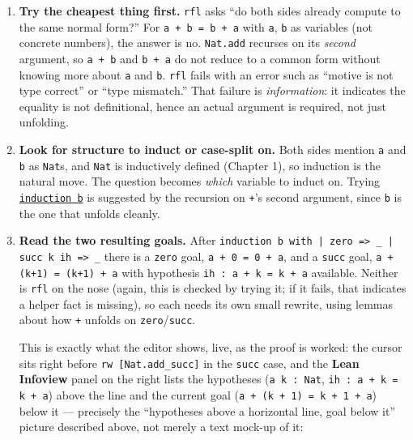 \begin{enumerate}
\def\labelenumi{\arabic{enumi}.}
\item
  \textbf{Try the cheapest thing first.} \texttt{rfl} asks ``do both sides already compute to the same normal form?'' For \texttt{a + b = b + a} with \texttt{a}, \texttt{b} as variables (not concrete numbers), the answer is no. \texttt{Nat.add} recurses on its \emph{second} argument, so \texttt{a + b} and \texttt{b + a} do not reduce to a common form without knowing more about \texttt{a} and \texttt{b}. \texttt{rfl} fails with an error such as ``motive is not type correct'' or ``type mismatch.'' That failure is \emph{information}: it indicates the equality is not definitional, hence an actual argument is required, not just unfolding.
\item
  \textbf{Look for structure to induct or case-split on.} Both sides mention \texttt{a} and \texttt{b} as \texttt{Nat}s, and \texttt{Nat} is inductively defined (Chapter 1), so induction is the natural move. The question becomes \emph{which} variable to induct on. Trying \href{https://lean-lang.org/doc/reference/latest/Tactic-Proofs/Tactic-Reference/}{\texttt{induction b}} is suggested by the recursion on \texttt{+}'s second argument, since \texttt{b} is the one that unfolds cleanly.
\item
  \textbf{Read the two resulting goals.} After \texttt{induction b with | zero => \_\allowbreak{} | succ k ih => \_\allowbreak{}} there is a \texttt{zero} goal, \texttt{a + 0 = 0 + a}, and a \texttt{succ} goal, \texttt{a + (k+1) = (k+1) + a} with hypothesis \texttt{ih : a + k = k + a} available. Neither is \texttt{rfl} on the nose (again, this is checked by trying it; if it fails, that indicates a helper fact is missing), so each needs its own small rewrite, using lemmas about how \texttt{+} unfolds on \texttt{zero}/\texttt{succ}.

  This is exactly what the editor shows, live, as the proof is worked: the cursor sits right before \texttt{rw [Nat.add\_\allowbreak{}succ]} in the \texttt{succ} case, and the \textbf{Lean Infoview} panel on the right lists the hypotheses (\texttt{a k : Nat}, \texttt{ih : a + k = k + a}) above the line and the current goal (\texttt{a + (k + 1) = k + 1 + a}) below it --- precisely the ``hypotheses above a horizontal line, goal below it'' picture described above, not merely a text mock-up of it:


\end{enumerate}
